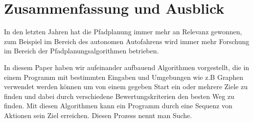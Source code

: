 \chapter{Zusammenfassung und Ausblick}
\label{Zusammenfassung und Ausblick}
In den letzten Jahren hat die Pfadplanung immer mehr an Relevanz gewonnen, zum Beispiel im Bereich des autonomen Autofahrens wird immer mehr Forschung 
im Bereich der Pfadplanungsalgorithmen betrieben. \cite{Karur:21}

In diesem Paper haben wir aufeinander aufbauend Algorithmen vorgestellt, die in einem Programm mit bestimmten Eingaben und Umgebungen 
wie z.B Graphen verwendet werden können um von einem gegeben Start ein oder mehrere Ziele zu finden und dabei durch verschiedene Bewertungskriterien den besten Weg zu finden.
Mit diesen Algorithmen kann ein Programm durch eine Sequenz von Aktionen sein Ziel erreichen. Diesen Prozess nennt man Suche.
\cite{Russell:10c}
